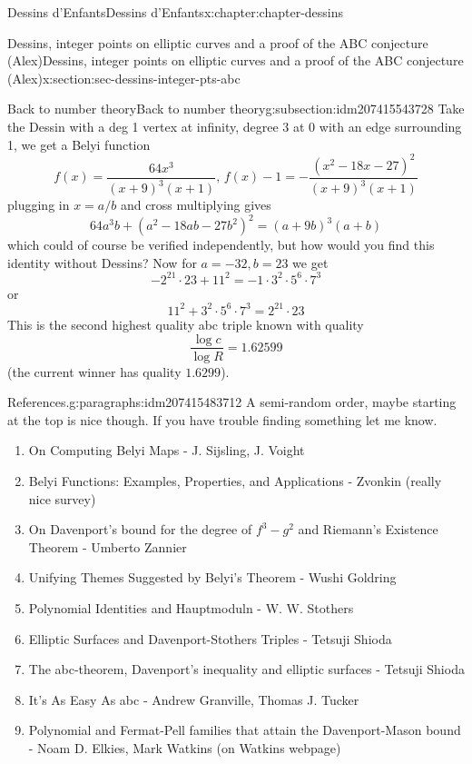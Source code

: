 \documentclass[oneside,10pt,]{book}
\numberwithin{equation}{section}
\begin{document}
\begin{chapterptx}{Dessins d'Enfants}{}{Dessins d'Enfants}{}{}{x:chapter:chapter-dessins}
\begin{sectionptx}{Dessins, integer points on elliptic curves and a proof of the ABC conjecture (Alex)}{}{Dessins, integer points on elliptic curves and a proof of the ABC conjecture (Alex)}{}{}{x:section:sec-dessins-integer-pts-abc}
\begin{subsectionptx}{Back to number theory}{}{Back to number theory}{}{}{g:subsection:idm207415543728}
Take the Dessin with a deg 1 vertex at infinity, degree 3 at 0 with an edge surrounding 1, we get a Belyi function%
\begin{equation*}
f(x) = \frac{64x^3}{(x+9)^3 (x+1)},\,f(x) - 1 = -\frac{(x^2 - 18x -27)^2}{(x+9)^3(x+1)}
\end{equation*}
plugging in \(x=a/b\) and cross multiplying gives%
\begin{equation*}
64a^3 b + (a^2 - 18ab - 27b^2)^2 = (a+9b)^3(a+b)
\end{equation*}
which could of course be verified independently, but how would you find this identity without Dessins? Now for \(a = -32, b= 23\) we get%
\begin{equation*}
- 2^{21} \cdot 23 +  11^2 =  -1 \cdot 3^2 \cdot 5^6 \cdot 7^3
\end{equation*}
or%
\begin{equation*}
11^2 + 3^2 \cdot 5^6 \cdot 7^3 = 2^{21} \cdot 23
\end{equation*}
This is the second highest quality abc triple known with quality%
\begin{equation*}
\frac{\log c}{\log R} = 1.62599
\end{equation*}
(the current winner has quality \(1.6299\)).%
\begin{paragraphs}{References.}{g:paragraphs:idm207415483712}%
A semi-random order, maybe starting at the top is nice though. If you have trouble finding something let me know.%
\begin{enumerate}
\item{}On Computing Belyi Maps - J. Sijsling, J. Voight%
\item{}Belyi Functions: Examples, Properties, and Applications - Zvonkin (really nice survey)%
\item{}On Davenport’s bound for the degree of \(f^3 - g^2\) and Riemann's Existence Theorem - Umberto Zannier%
\item{}Unifying Themes Suggested by Belyi's Theorem - Wushi Goldring%
\item{}Polynomial Identities and Hauptmoduln - W. W. Stothers%
\item{}Elliptic Surfaces and Davenport-Stothers Triples -  Tetsuji Shioda%
\item{}The abc-theorem, Davenport’s inequality and elliptic surfaces - Tetsuji Shioda%
\item{}It's As Easy As abc -  Andrew Granville, Thomas J. Tucker%
\item{}Polynomial and Fermat-Pell families that attain the Davenport-Mason bound - Noam D. Elkies, Mark Watkins (on Watkins webpage)%

\end{enumerate}
\end{paragraphs}
\end{subsectionptx}
\end{sectionptx}
\end{chapterptx}
\end{document}
